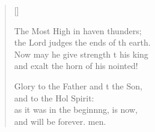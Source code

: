 \begin{verse}[\versewidth]
\begin{patverse}
The Most High in haven thunders;\Med\\
the Lord judges the ends of th earth.\\
Now may he give strength t his king\Med\\
and exalt the horn of his nointed!

Glory to the Father and t the Son,\Med\\
and to the Hol Spirit:\\
as it was in the beginn\pointup{\i}ng, is now,\Med\\
and will be forever. men.
  \end{patverse}
\end{verse}
